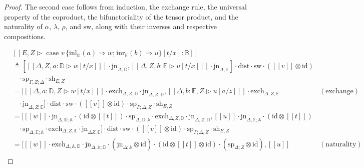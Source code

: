 \documentclass[10pt,a4paper]{amsart}
\theoremstyle{definition}
\theoremstyle{definition}
\theoremstyle{definition}
\theoremstyle{definition}
\theoremstyle{definition}
\theoremstyle{definition}
\begin{document}
\begin{proof}
The second case follows from induction, the exchange rule, the universal property of the coproduct,  the bifunctoriality of the tensor product, and the naturality of $\alpha$, $\lambda$, $\rho$, and $\text{sw}$, along with their inverses and respective compositions.

\begin{align*}
  &[\![E, Z \triangleright \text{ case } v  \hspace{2pt}  \{\text{inl}_{\mathbb{D}} (a) \Rightarrow w ; \hspace{1pt} \text{inr}_{\mathbb{E}} (b) \Rightarrow u\} [t/x]: \mathbb{B}]\!] \\
  & \triangleq  \left[[\![ \Delta  , Z ,  a:\mathbb{D} \triangleright w[t/x] ]\!] \cdot \text{jn}_{ \Delta;\mathbb{D}},[\![ \Delta, Z, b:\mathbb{E} \triangleright u[t/x]  ]\!] \cdot \text{jn}_{ \Delta;\mathbb{E}}\right] \cdot \text{dist} \cdot \text{sw} \cdot ([\![ v ]\!]   \otimes \text{id})  \\
  &  \hspace{10pt}  \cdot \text{sp}_{\Gamma, Z;\Delta} \cdot \text{sh}_{E,Z} \hspace{10pt} \\
  & =   [[\![ \Delta ,  a:\mathbb{D} , Z \triangleright  w [t/x]  ]\!] \cdot \text{exch}_{\Delta,Z,\mathbb{D}} \cdot \text{jn}_{\Delta, Z; \mathbb{D}},[\![  \Delta ,  b:\mathbb{E} , Z \triangleright u [a/z]   ]\!] \cdot \text{exch}_{\Delta, Z,\mathbb{E}}   & {(\text{exchange})} \\
  & \hspace{10pt} \cdot \text{jn}_{\Delta, Z; \mathbb{E}} ] \cdot \text{dist} \cdot \text{sw} \cdot ([\![v]\!] \otimes \text{id})  \cdot \text{sp}_{\Gamma; \Delta, Z} \cdot \text{sh}_{E,Z}    \\
  & =  [[\![ w ]\!]  \cdot \text{jn}_{\Delta,\mathbb{D}; \mathbb{A}} \cdot (\text{id} \otimes [\![t]\!] ) \cdot \text{sp}_{\Delta,\mathbb{D}; \mathbb{A}} \cdot  \text{exch}_{\Delta, Z,\mathbb{D}} \cdot \text{jn}_{\Delta, Z; \mathbb{D}} , [\![ u ]\!]\cdot \text{jn}_{\Delta,\mathbb{E}; \mathbb{A}} \cdot (\text{id} \otimes [\![ t]\!] )     \\
  & \hspace{10pt} \cdot \text{sp}_{\Delta,\mathbb{E}; \mathbb{A}}  \cdot \text{exch}_{\Delta, Z,\mathbb{E}} \cdot\text{jn}_{\Delta Z, \mathbb{E}} ]\cdot \text{dist} \cdot \text{sw} \cdot ([\![v]\!] \otimes \text{id})  \cdot \text{sp}_{\Gamma; \Delta, Z} \cdot \text{sh}_{E,Z} \\
  & = [[\![ w ]\!] \cdot \text{exch}_{\Delta, \mathbb{A},\mathbb{D}} \cdot \text{jn}_{\Delta, \mathbb{A}; \mathbb{D}} \cdot (\text{jn}_{\Delta; \mathbb{A}} \otimes \text{id}) \cdot (\text{id} \otimes [\![t]\!]  \otimes \text{id}) \cdot  (\text{sp}_{\Delta; Z} \otimes \text{id}),  [\![ u ]\!]  & {(\text{naturality})} \\

\end{align*}
\end{proof}
\end{document}
